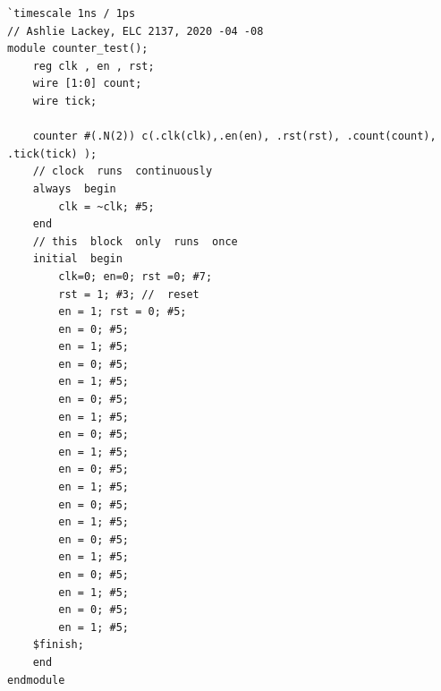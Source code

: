 \documentclass[11pt]{article}
\begin{document}
\begin{lstlisting}[style=Verilog,caption= counter\_test testbench Verilog Code,label=code:ex ]
`timescale 1ns / 1ps
// Ashlie Lackey, ELC 2137, 2020 -04 -08
module counter_test();
	reg clk , en , rst;
	wire [1:0] count;
	wire tick;
	
	counter #(.N(2)) c(.clk(clk),.en(en), .rst(rst), .count(count), .tick(tick) );
	// clock  runs  continuously
	always  begin
		clk = ~clk; #5;
	end
	// this  block  only  runs  once
	initial  begin
		clk=0; en=0; rst =0; #7;
		rst = 1; #3; //  reset
		en = 1; rst = 0; #5;
		en = 0; #5;
		en = 1; #5;
		en = 0; #5;
		en = 1; #5;
		en = 0; #5; 
		en = 1; #5;
		en = 0; #5; 
		en = 1; #5;
		en = 0; #5; 
		en = 1; #5;
		en = 0; #5; 
		en = 1; #5;
		en = 0; #5; 
		en = 1; #5;
		en = 0; #5; 
		en = 1; #5;
		en = 0; #5;
		en = 1; #5;  
	$finish;
	end
endmodule
\end{lstlisting}

\begin{lstlisting}[style=Verilog,caption= sseg4\_TDM\_test Code,label=code:ex ]

\end{lstlisting}
\end{document}
